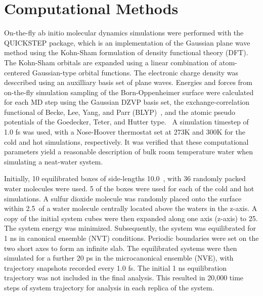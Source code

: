 \section{Computational Methods}

On-the-fly ab initio molecular dynamics simulations were performed with the QUICKSTEP package, which is an implementation of the Gaussian plane wave method using the Kohn-Sham formulation of density functional theory (DFT).~\cite{VandeVondele2005} The Kohn-Sham orbitals are expanded using a linear combination of atom-centered Gaussian-type orbital functions. The electronic charge density was desccribed using an auxilliary basis set of plane waves. Energies and forces from on-the-fly simulation sampling of the Born-Oppenheimer surface were calculated for each MD step using the Gaussian DZVP basis set, the exchange-correlation functional of Becke, Lee, Yang, and Parr (BLYP)~\cite{LEE1988}, and the atomic pseudo potentials of the Goedecker, Teter, and Hutter type.~\cite{Goedecker1996} A simulation timestep of 1.0 fs was used, with a Nose-Hoover thermostat set at 273K and 300K for the cold and hot simulations, respectively. It was verified that these computational parameters yield a reasonable description of bulk room temperature water when simulating a neat-water system. 

Initially, 10 equilibrated boxes of side-lengths 10.0\angs~, with 36 randomly packed water molecules were used. 5 of the boxes were used for each of the cold and hot simulations. A sulfur dioxide molecule was randomly placed onto the surface within 2.5\angs~of a water molecule centrally located above the waters in the z-axis. A copy of the initial system cubes were then expanded along one axis (z-axis) to 25\angs. The system energy was minimized. Subsequently, the system was equilibrated for 1 ns in canonical ensemble (NVT) conditions. Periodic boundaries were set on the two short axes to form an infinite slab. The equilibrated systems were then simulated for a further 20 ps in the microcanonical ensemble (NVE), with trajectory snapshots recorded every 1.0 fs. The initial 1 ns equilibration trajectory was not included in the final analysis. This resulted in 20,000 time steps of system trajectory for analysis in each replica of the system.
 
